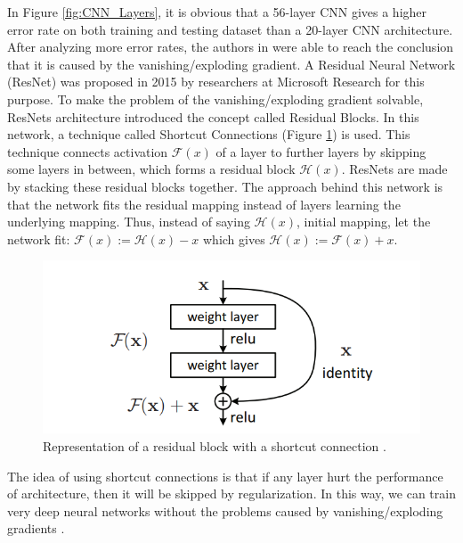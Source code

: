 \documentclass[12pt]{diazessay}
\begin{document}
    In Figure \ref{fig:CNN_Layers}, it is obvious that a 56-layer CNN gives a higher error rate on both training and testing dataset than a 20-layer CNN architecture. After analyzing more error rates, the authors in \cite{he2016deep} were able to reach the conclusion that it is caused by the vanishing/exploding gradient. A Residual Neural Network (ResNet) was proposed in 2015 by researchers at Microsoft Research for this purpose. To make the problem of the vanishing/exploding gradient solvable, ResNets architecture introduced the concept called Residual Blocks. In this network, a technique called Shortcut Connections (Figure \ref{fig:Residual-Block}) is used. This technique connects activation $\mathcal{F}(x)$ of a layer to further layers by skipping some layers in between, which forms a residual block $\mathcal{H}(x)$. ResNets are made by stacking these residual blocks together. The approach behind this network is that the network fits the residual mapping instead of layers learning the underlying mapping. Thus, instead of saying $\mathcal{H}(x)$, initial mapping, let the network fit: $\mathcal{F}(x) := \mathcal{H}(x) - x$  which gives  $\mathcal{H}(x) := \mathcal{F}(x) + x$. 
    \begin{figure}[htp]
        \centering
        \includegraphics[width=12cm]{Figures/Residual-Block.png}
        \caption[Representation of a  residual block with a shortcut connection]{ Representation of a  residual block with a shortcut connection \cite{he2016deep}.}
        \label{fig:Residual-Block}
    \end{figure}
        
    The idea of using shortcut connections is that if any layer hurt the performance of architecture, then it will be skipped by regularization. In this way, we can train very deep neural networks without the problems caused by vanishing/exploding gradients \cite{he2016deep}.
        
\end{document}
